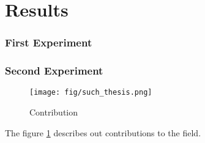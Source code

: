 \part{Results}
\label{part:results}


\section{First Experiment}
\lipsum


\section{Second Experiment}
\lipsum

\begin{figure}[h]
 \centering
 \texttt{[image: fig/such\_thesis.png]}
 \caption{
     Contribution
 }
 \label{fig:thesis}
\end{figure}

The figure \ref{fig:thesis} describes out contributions to the field.
